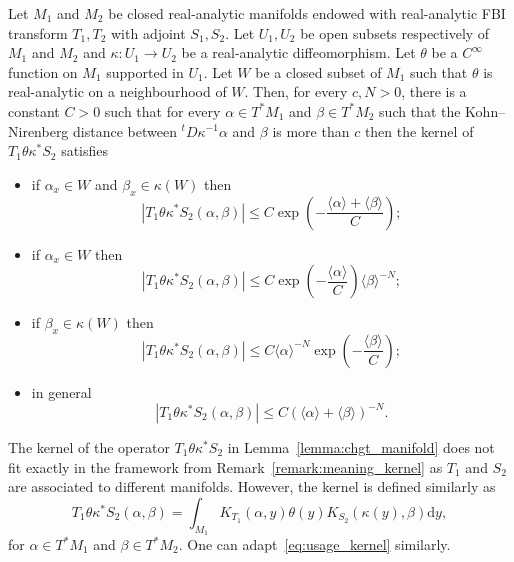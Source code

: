 \documentclass[AHL,Unicode,longabstracts,published]{cedram}
\newcommand{\p}[1]{\left(#1\right)}
\newcommand{\va}[1]{\left|#1\right|}
\newcommand{\brac}[1]{\langle #1 \rangle}
\newcommand{\rmd}{\mathrm{d}}
\begin{document}
\begin{lemm}\label{lemma:chgt_manifold}
Let $M_1$ and $M_2$ be closed real-analytic manifolds endowed with real-analytic FBI transform $T_1,T_2$ with adjoint $S_1,S_2$. Let $U_1,U_2$ be open subsets respectively of $M_1$ and $M_2$ and $\kappa : U_1 \to U_2$ be a real-analytic diffeomorphism. Let $\theta$ be a $C^\infty$ function on $M_1$ supported in $U_1$. Let $W$ be a closed subset of $M_1$ such that $\theta$ is real-analytic on a neighbourhood of $W$. Then, for every $c,N > 0$, there is a constant $C > 0$ such that for every $\alpha \in T^* M_1$ and $\beta \in T^* M_2$ such that the Kohn--Nirenberg distance between ${}^t D \kappa^{-1} \alpha$ and $\beta$ is more than $c$ then the kernel of $T_1 \theta \kappa^* S_2$ satisfies
\begin{itemize}
\item if $\alpha_x \in W$ and $\beta_x \in \kappa(W)$ then
\begin{equation*}
\va{T_1 \theta \kappa^* S_2(\alpha,\beta)} \leq C \exp\p{- \frac{\brac{\alpha} + \brac{\beta}}{C}};
\end{equation*}
\item if $\alpha_x \in W$ then
\begin{equation*}
\va{T_1 \theta \kappa^* S_2(\alpha,\beta)} \leq C \exp\p{- \frac{\brac{\alpha}}{C}} \brac{\beta}^{-N};
\end{equation*}
\item if $\beta_x \in \kappa(W)$ then
\begin{equation*}
\va{T_1 \theta \kappa^* S_2(\alpha,\beta)} \leq C \brac{\alpha}^{-N} \exp\p{- \frac{\brac{\beta}}{C}};
\end{equation*}
\item in general
\begin{equation*}
\va{T_1 \theta \kappa^* S_2(\alpha,\beta)} \leq C \p{\brac{\alpha} + \brac{\beta}}^{-N}.
\end{equation*}
\end{itemize}
\end{lemm}

\begin{rema}
The kernel of the operator $T_1 \theta \kappa^* S_2$ in Lemma~\ref{lemma:chgt_manifold} does not fit exactly in the framework from Remark~\ref{remark:meaning_kernel} as $T_1$ and $S_2$ are associated to different manifolds. However, the kernel is defined similarly as
\begin{equation*}
T_1 \theta \kappa^* S_2 (\alpha,\beta) = \int_{M_1} K_{T_1}(\alpha,y)\theta(y) K_{S_2}(\kappa(y), \beta) \rmd y,
\end{equation*}
for $\alpha \in T^* M_1$ and $\beta \in T^* M_2$. One can adapt~\eqref{eq:usage_kernel} similarly.
\end{rema}
\end{document}
